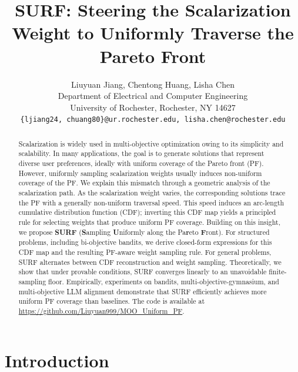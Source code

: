 \documentclass{article}
\title{SURF: Steering the Scalarization Weight to Uniformly Traverse the Pareto Front}
\author{%
 Liuyuan Jiang, Chentong Huang, Lisha Chen%
 \\
 Department of Electrical and Computer Engineering\\
 University of Rochester, Rochester, NY 14627 \\
 \texttt{\{ljiang24, chuang80\}@ur.rochester.edu, lisha.chen@rochester.edu}
}
\begin{document}
\maketitle

\vspace{-0.1cm}
\begin{abstract}
\vspace{-0.2cm}

Scalarization is widely used in multi-objective optimization owing to its simplicity and scalability. In many applications, the goal is to generate  solutions that represent diverse user preferences, ideally with uniform coverage of the Pareto front (PF).
However, uniformly sampling scalarization weights usually induces non-uniform coverage of the PF. 
We explain this mismatch through a geometric analysis of the scalarization path. As the scalarization weight varies, the corresponding solutions trace the PF with a generally non-uniform traversal speed. This speed induces an arc-length cumulative distribution function (CDF); inverting this CDF map yields a principled rule for selecting weights that produce uniform PF coverage.
Building on this
insight, we propose \textbf{SURF} (\textbf{S}ampling \textbf{U}niformly along the
Pa\textbf{r}eto \textbf{F}ront). 
For structured problems, including bi-objective bandits, we derive closed-form expressions for this CDF map and the resulting PF-aware weight sampling rule. For general problems, SURF alternates between CDF reconstruction and weight sampling. 
Theoretically, we show that under provable conditions, SURF converges linearly to an unavoidable finite-sampling floor.
Empirically, experiments on bandits, multi-objective-gymnasium, and multi-objective LLM alignment demonstrate that SURF efficiently achieves more uniform PF coverage than baselines.
The code is available at \url{https://github.com/Liuyuan999/MOO_Uniform_PF}.




\end{abstract}

\vspace{-0.2cm}
\section{Introduction}
\label{sec:intro}
\vspace{-0.25cm}
\end{document}
